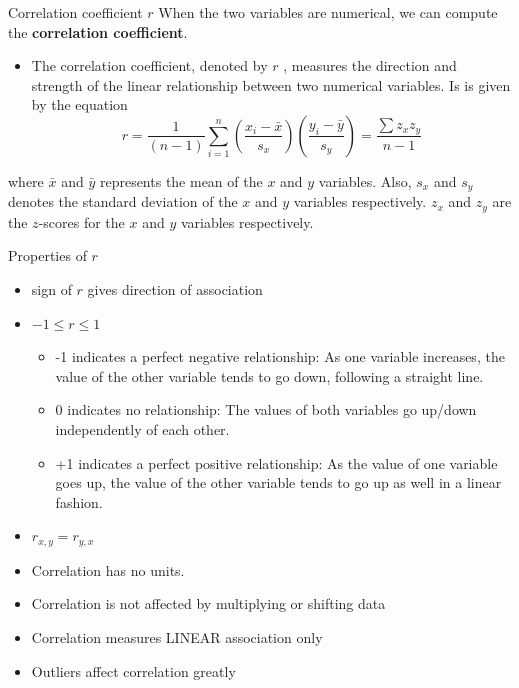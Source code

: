 \documentclass[
  ignorenonframetext,
]{beamer}
\providecommand{\tightlist}{%
  \setlength{\itemsep}{0pt}\setlength{\parskip}{0pt}}
\begin{document}
\begin{frame}{Correlation coefficient \(r\)}
\protect\hypertarget{correlation-coefficient-r}{}
When the two variables are numerical, we can compute the
\textbf{correlation coefficient}.

\begin{itemize}
\tightlist
\item
  The correlation coefficient, denoted by \(r\) , measures the direction
  and strength of the linear relationship between two numerical
  variables. Is is given by the equation
  \[r=\frac{1}{(n-1)}\sum_{i=1}^n \left(\frac{x_i-\bar{x}}{s_x}\right)\left(\frac{y_i-\bar{y}}{s_y}\right)=\frac{\sum z_x z_y}{n-1}\]
\end{itemize}

where \(\bar{x}\) and \(\bar{y}\) represents the mean of the \(x\) and
\(y\) variables. Also, \(s_x\) and \(s_y\) denotes the standard
deviation of the \(x\) and \(y\) variables respectively. \(z_x\) and
\(z_y\) are the \(z\)-scores for the \(x\) and \(y\) variables
respectively.
\end{frame}

\begin{frame}{Properties of \(r\)}
\protect\hypertarget{properties-of-r}{}
\begin{itemize}
\item
  sign of \(r\) gives direction of association
\item
  \(-1\leq r \leq 1\)

  \begin{itemize}
  \tightlist
  \item
    -1 indicates a perfect negative relationship: As one variable
    increases, the value of the other variable tends to go down,
    following a straight line.
  \item
    0 indicates no relationship: The values of both variables go up/down
    independently of each other.
  \item
    +1 indicates a perfect positive relationship: As the value of one
    variable goes up, the value of the other variable tends to go up as
    well in a linear fashion.
  \end{itemize}
\item
  \(r_{x,y}= r_{y,x}\)
\item
  Correlation has no units.
\item
  Correlation is not affected by multiplying or shifting data
\item
  Correlation measures LINEAR association only
\item
  Outliers affect correlation greatly
\end{itemize}
\end{frame}
\end{document}
